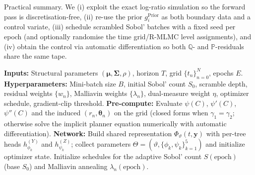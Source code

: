 \documentclass[11pt,letterpaper,oneside]{article}
\numberwithin{equation}{section}
\newcommand{\1}{\mathbf{1}}
\begin{document}
Practical summary. We (i) exploit the exact log-ratio simulation so the forward pass is discretisation-free, (ii) re-use the prior $g_i^{\text{Prior}}$ as both boundary data and a control variate, (iii) schedule scrambled Sobol' batches with a fixed seed per epoch (and optionally randomise the time grid/R-MLMC level assignments), and (iv) obtain the control via automatic differentiation so both $\mathbb{Q}$- and $\mathbb{P}$-residuals share the same tape.
\begin{algorithm}[H]
  \caption{Adaptive RQMC Deep BSDE Solver with Malliavin-Gradient Regularization}\label{alg:deepbsde}
  \begin{algorithmic}[1]
  \State \textbf{Inputs:} Structural parameters $(\bm{\mu}, \bm{\Sigma}, \rho)$, horizon $T$, grid $\{t_n\}_{n=0}^{N}$, epochs $E$.
  \State \textbf{Hyperparameters:} Mini-batch size $B$, initial Sobol' count $S_0$, scramble depth, residual weights $\{w_n\}$, Malliavin weights $\{\lambda_n\}$, dual-measure weight $\eta$, optimizer schedule, gradient-clip threshold.
  \State \textbf{Pre-compute:} Evaluate $\psi(C)$, $\psi'(C)$, $\psi''(C)$ and the induced $(r_n,\bm{\theta}_n)$ on the grid (closed forms when $\gamma_1=\gamma_2$; otherwise solve the implicit planner equation numerically with automatic differentiation).
  \State \textbf{Network:} Build shared representation $\Phi_\vartheta(t,\bm{y})$ with per-tree heads $h_{\phi_k}^{(Y)}$ and $h_{\psi_k}^{(Z)}$; collect parameters $\Theta=(\vartheta,\{\phi_k,\psi_k\}_{k=1}^5)$ and initialize optimizer state.
  \State Initialize schedules for the adaptive Sobol' count $S(\mathrm{epoch})$ (base $S_0$) and Malliavin annealing $\lambda_n(\mathrm{epoch})$.


\end{algorithmic}
\end{algorithm}
\end{document}
